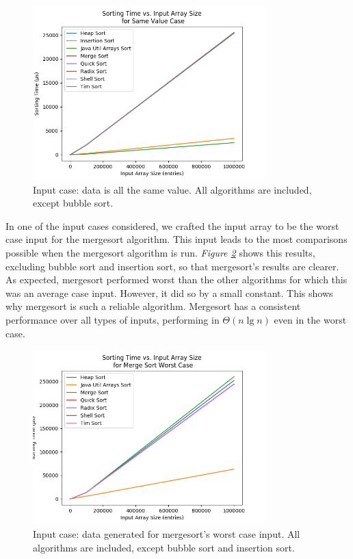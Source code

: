 \begin{figure}[!ht]
\centering
\includegraphics[width=9cm]{figures/plots_without_BubbleSort/sorting_time_vs_input_array_size_SameValueCase.png}
\caption{Input case: data is all the same value. All algorithms are included, except bubble sort.}
\label{fig:allButBubbleSameValue}
\end{figure}

In one of the input cases considered, we crafted the input array to be the worst case input for the mergesort algorithm. This input leads to the most comparisons possible when the mergesort algorithm is run. \textit{Figure \ref{fig:allButBubbleInsertionMergesortWorstCase}} shows this results, excluding bubble sort and insertion sort, so that mergesort's results are clearer. As expected, mergesort performed worst than the other algorithms for which this was an average case input. However, it did so by a small constant. This shows why mergesort is such a reliable algorithm. Mergesort has a consistent performance over all types of inputs, performing in $\Theta(n \lg n)$ even in the worst case.

\begin{figure}[!ht]
\centering
\includegraphics[width=9cm]{figures/plots_without_BubbleSort_InsertionSort/sorting_time_vs_input_array_size_MergeSortWorstCase.png}
\caption{Input case: data generated for mergesort's worst case input. All algorithms are included, except bubble sort and insertion sort.}
\label{fig:allButBubbleInsertionMergesortWorstCase}
\end{figure}

